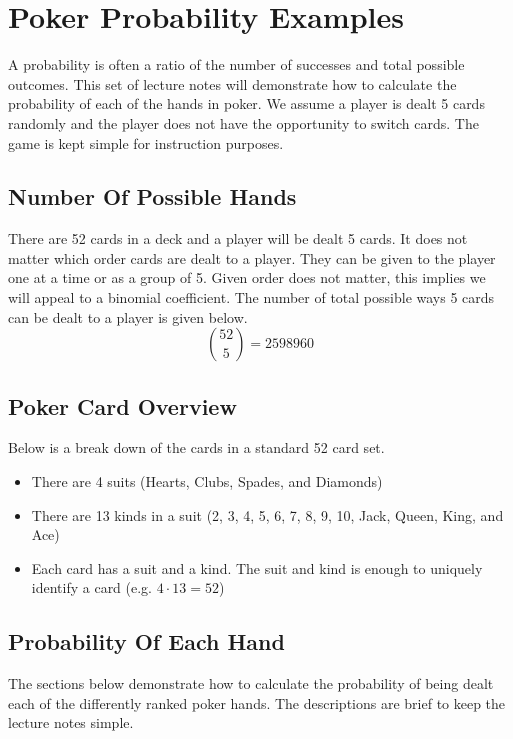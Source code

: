 \section*{Poker Probability Examples}
A probability is often a ratio of the number of successes and total possible outcomes.  This set of lecture notes will demonstrate how to calculate the probability of each of the hands in poker.  We assume a player is dealt 5 cards randomly and the player does not have the opportunity to switch cards.  The game is kept simple for instruction purposes. \\


\subsection*{Number Of Possible Hands}
There are 52 cards in a deck and a player will be dealt 5 cards.  It does not matter which order cards are dealt to a player.  They can be given to the player one at a time or as a group of 5.  Given order does not matter, this implies we will appeal to a binomial coefficient.  The number of total possible ways 5 cards can be dealt to a player is given below.
$$\binom{52}{5} = 2598960$$

\subsection*{Poker Card Overview}
Below is a break down of the cards in a standard 52 card set.
\begin{itemize}
    \item There are 4 suits (Hearts, Clubs, Spades, and Diamonds)
    \item There are 13 kinds in a suit (2, 3, 4, 5, 6, 7, 8, 9, 10, Jack, Queen, King, and Ace)
    \item Each card has a suit and a kind.  The suit and kind is enough to uniquely identify a card (e.g. $4 \cdot 13 = 52$)
\end{itemize}

\subsection*{Probability Of Each Hand}
The sections below demonstrate how to calculate the probability of being dealt each of the differently ranked poker hands.  The descriptions are brief to keep the lecture notes simple.

